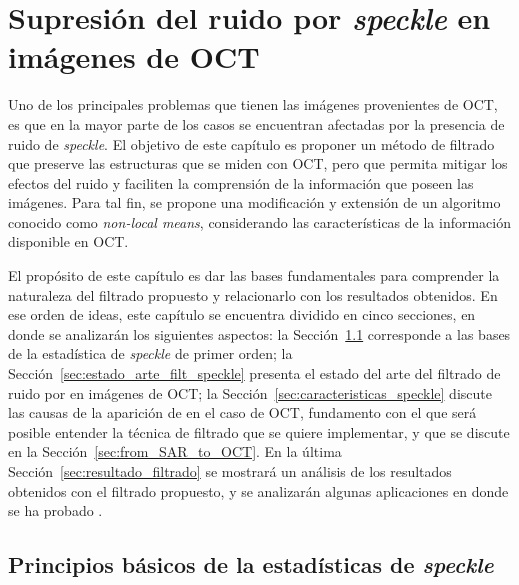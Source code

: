 \chapter{Supresión del ruido por \textit{speckle} en imágenes de OCT}
\label{chapter:supresion_ruido_en_oct}

Uno de los principales problemas que tienen las imágenes provenientes de OCT, es que en la mayor parte de los casos se encuentran afectadas por la presencia de ruido de \textit{speckle}. El objetivo de este capítulo es proponer un método de filtrado que preserve las estructuras que se miden con OCT, pero que permita mitigar los efectos del ruido y faciliten la comprensión de la información que poseen las imágenes. Para tal fin, se propone una modificación y extensión de un algoritmo conocido como \textit{non-local means}, considerando las características de la información disponible en OCT. 

El propósito de este capítulo es dar las bases fundamentales para comprender la naturaleza del filtrado propuesto y relacionarlo con los resultados obtenidos. En ese orden de ideas, este capítulo se encuentra dividido en cinco secciones, en donde se analizarán los siguientes aspectos: la Sección~\ref{sec:principios_estadistica_speckle} corresponde a las bases de la estadística de \textit{speckle} de primer orden; la Sección~\ref{sec:estado_arte_filt_speckle} presenta el estado del arte del filtrado de ruido por \speckle en imágenes de OCT; la Sección~\ref{sec:caracteristicas_speckle} discute las causas de la aparición de \speckle en el caso de OCT, fundamento con el que será posible entender la técnica de filtrado que se quiere implementar, y que se discute en la Sección~\ref{sec:from_SAR_to_OCT}. En la última Sección~\ref{sec:resultado_filtrado} se mostrará un análisis de los resultados obtenidos con el filtrado propuesto, y se analizarán algunas aplicaciones en donde se ha probado .

\section{Principios básicos de la estadísticas de \textit{speckle}}
\label{sec:principios_estadistica_speckle}

